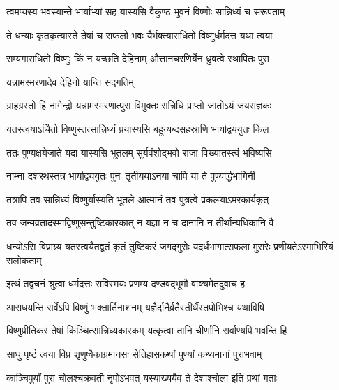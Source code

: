 \twolineshloka
{त्वमप्यस्य भवस्यान्ते भार्याभ्यां सह यास्यसि}
{वैकुण्ठ भुवनं विष्णोः सान्निध्यं च सरूपताम्} %

\twolineshloka
{ते धन्याः कृतकृत्यास्ते तेषां च सफलो भवः}
{यैर्भक्त्याराधितो विष्णुर्धर्मदत्त यथा त्वया} %

\twolineshloka
{सम्यगाराधितो विष्णुः किं न यच्छति देहिनाम्}
{औत्तानचरणिर्येन ध्रुवत्वे स्थापितः पुरा} %


\onelineshloka
{यन्नामस्मरणादेव देहिनो यान्ति सद्गतिम्} %

\twolineshloka
{ग्राहग्रस्तो हि नागेन्द्रो यन्नामस्मरणात्पुरा}
{विमुक्तः सन्निधिं प्राप्तो जातोऽयं जयसंज्ञकः} %

\twolineshloka
{यतस्त्वयाऽर्चितो विष्णुस्तत्सान्निध्यं प्रयास्यसि}
{बहून्यब्दसहस्राणि भार्याद्वययुतः किल} %

\twolineshloka
{ततः पुण्यक्षयेजाते यदा यास्यसि भूतलम्}
{सूर्यवंशोद्भवो राजा विख्यातस्त्वं भविष्यसि} %

\twolineshloka
{नाम्ना दशरथस्तत्र भार्याद्वययुतः पुनः}
{तृतीययाऽनया चापि या ते पुण्यार्द्धभागिनी} %

\twolineshloka
{तत्रापि तव सान्निध्यं विष्णुर्यास्यति भूतले}
{आत्मानं तव पुत्रत्वे प्रकल्प्याऽमरकार्यकृत्} %

\twolineshloka
{तव जन्मव्रतादस्माद्विष्णुसन्तुष्टिकारकात्}
{न यज्ञा न च दानानि न तीर्थान्यधिकानि वै} %

\twolineshloka
{धन्योऽसि विप्राग्र्य यतस्त्वयैतद्व्रतं कृतं तुष्टिकरं जगद्गुरोः}
{यदर्धभागात्सफला मुरारेः प्रणीयतेऽस्माभिरियं सलोकताम्} %





\twolineshloka
{इत्थं तद्वचनं श्रुत्वा धर्मदत्तः सविस्मयः}
{प्रणम्य दण्डवद्भूमौ वाक्यमेतदुवाच ह} %

\twolineshloka
{आराधयन्ति सर्वेऽपि विष्णुं भक्तार्तिनाशनम्}
{यज्ञैर्दानैर्व्रतैस्तीर्थैस्तपोभिश्च यथाविषि} %

\twolineshloka
{विष्णुप्रीतिकरं तेषां किञ्चित्सान्निध्यकारकम्}
{यत्कृत्वा तानि चीर्णानि सर्वाण्यपि भवन्ति हि} %


\twolineshloka
{साधु पृष्टं त्वया विप्र शृणुष्वैकाग्रमानसः}
{सेतिहासकथां पुण्यां कथ्यमानां पुराभवाम्} %


\twolineshloka
{काञ्चिपुर्यां पुरा चोलश्चक्रवर्ती नृपोऽभवत्}
{यस्याख्ययैव ते देशाश्चोला इति प्रथां गताः} %

